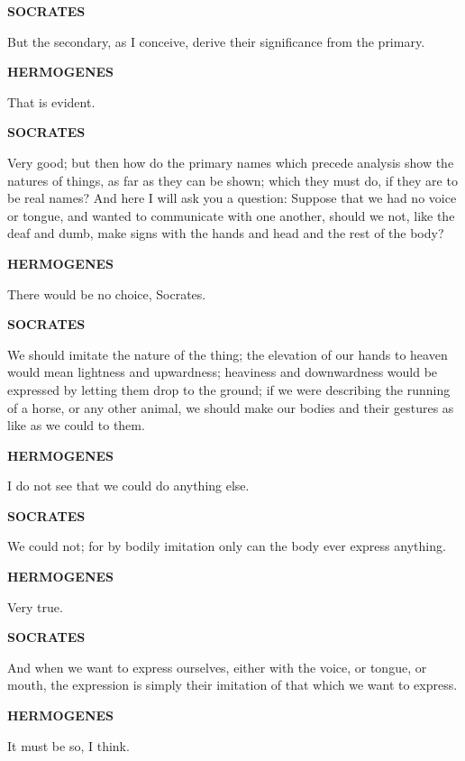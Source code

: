\documentclass[11pt,letter]{article}
\begin{document}
\par \textbf{SOCRATES}
\par   But the secondary, as I conceive, derive their significance from the primary.

\par \textbf{HERMOGENES}
\par   That is evident.

\par \textbf{SOCRATES}
\par   Very good; but then how do the primary names which precede analysis show the natures of things, as far as they can be shown; which they must do, if they are to be real names? And here I will ask you a question:  Suppose that we had no voice or tongue, and wanted to communicate with one another, should we not, like the deaf and dumb, make signs with the hands and head and the rest of the body?

\par \textbf{HERMOGENES}
\par   There would be no choice, Socrates.

\par \textbf{SOCRATES}
\par   We should imitate the nature of the thing; the elevation of our hands to heaven would mean lightness and upwardness; heaviness and downwardness would be expressed by letting them drop to the ground; if we were describing the running of a horse, or any other animal, we should make our bodies and their gestures as like as we could to them.

\par \textbf{HERMOGENES}
\par   I do not see that we could do anything else.

\par \textbf{SOCRATES}
\par   We could not; for by bodily imitation only can the body ever express anything.

\par \textbf{HERMOGENES}
\par   Very true.

\par \textbf{SOCRATES}
\par   And when we want to express ourselves, either with the voice, or tongue, or mouth, the expression is simply their imitation of that which we want to express.

\par \textbf{HERMOGENES}
\par   It must be so, I think.
\end{document}
